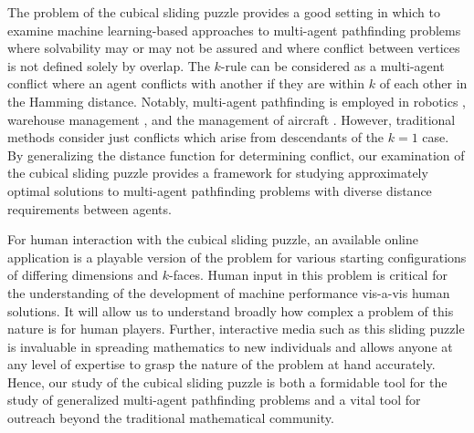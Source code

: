 \documentclass{article}
\theoremstyle{definition}
\begin{document}
The problem of the cubical sliding puzzle provides a good setting in which to examine machine learning-based approaches to multi-agent pathfinding problems where solvability may or may not be assured and where conflict between vertices is not defined solely by overlap. The $k$-rule can be considered as a multi-agent conflict where an agent conflicts with another if they are within $k$ of each other in the Hamming distance. Notably, multi-agent pathfinding is employed in robotics \cite{veloso2015cobots}, warehouse management \cite{wurman2008coordinating}, and the management of aircraft \cite{morris2016planning}. However, traditional methods \cite{stern2019multi} \cite{stern2019multi} consider just conflicts which arise from descendants of the $k=1$ case. By generalizing the distance function for determining conflict, our examination of the cubical sliding puzzle provides a framework for studying approximately optimal solutions to multi-agent pathfinding problems with diverse distance requirements between agents.

For human interaction with the cubical sliding puzzle, an available online application is a playable version of the problem for various starting configurations of differing dimensions and $k$-faces. Human input in this problem is critical for the understanding of the development of machine performance vis-a-vis human solutions. It will allow us to understand broadly how complex a problem of this nature is for human players. Further, interactive media such as this sliding puzzle is invaluable in spreading mathematics to new individuals and allows anyone at any level of expertise to grasp the nature of the problem at hand accurately. Hence, our study of the cubical sliding puzzle is both a formidable tool for the study of generalized multi-agent pathfinding problems and a vital tool for outreach beyond the traditional mathematical community. 




	
\end{document}
